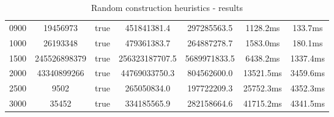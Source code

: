 \begin{table}
{\begin{tabular}{|| c | c | c | c | c | c | c ||}
0900 & 19456973 & true & 451841381.4 & 297285563.5 & 1128.2ms & 133.7ms \\
1000 & 26193348 & true & 479361383.7 & 264887278.7 & 1583.0ms & 180.1ms \\
1500 & 245526898379 & true & 256323187707.5 & 5689971833.5 & 6438.2ms & 1337.4ms \\
2000 & 43340899266 & true & 44769033750.3 & 804562600.0 & 13521.5ms & 3459.6ms \\
2500 & 9502 & true & 265050834.0 & 197722209.3 & 25752.3ms & 4352.3ms \\
3000 & 35452 & true & 334185565.9 & 282158664.6 & 41715.2ms & 4341.5ms \\
		\hline
	\end{tabular}
}
\caption{Random construction heuristics - results}
\end{table}